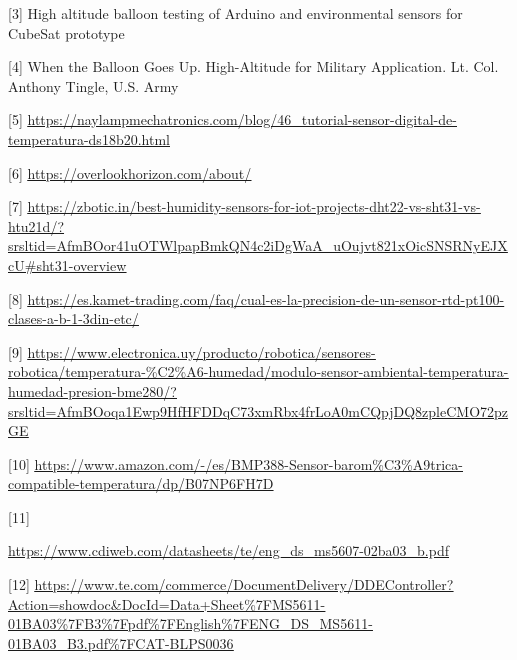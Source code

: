 \documentclass[12pt,a4paper]{article}
\begin{document}
{[}3{]} High altitude balloon testing of Arduino and environmental sensors for CubeSat prototype

{[}4{]} When the Balloon Goes Up. High-Altitude for Military Application. Lt. Col. Anthony Tingle, U.S. Army

{[}5{]} \href{https://naylampmechatronics.com/blog/46_tutorial-sensor-digital-de-temperatura-ds18b20.html}{\ul{https://naylampmechatronics.com/blog/46\_tutorial-sensor-digital-de-temperatura-ds18b20.html}}

{[}6{]} \href{https://overlookhorizon.com/about/}{\ul{https://overlookhorizon.com/about/}}

{[}7{]} \href{https://zbotic.in/best-humidity-sensors-for-iot-projects-dht22-vs-sht31-vs-htu21d/?srsltid=AfmBOor41uOTWlpapBmkQN4c2iDgWaA_uOujvt821xOicSNSRNyEJXcU\#sht31-overview}{\ul{https://zbotic.in/best-humidity-sensors-for-iot-projects-dht22-vs-sht31-vs-htu21d/?srsltid=AfmBOor41uOTWlpapBmkQN4c2iDgWaA\_uOujvt821xOicSNSRNyEJXcU\#sht31-overview}}

{[}8{]} \href{https://es.kamet-trading.com/faq/cual-es-la-precision-de-un-sensor-rtd-pt100-clases-a-b-1-3din-etc/}{\ul{https://es.kamet-trading.com/faq/cual-es-la-precision-de-un-sensor-rtd-pt100-clases-a-b-1-3din-etc/}}

{[}9{]} \href{https://www.electronica.uy/producto/robotica/sensores-robotica/temperatura-\%C2\%A6-humedad/modulo-sensor-ambiental-temperatura-humedad-presion-bme280/?srsltid=AfmBOoqa1Ewp9HfHFDDqC73xmRbx4frLoA0mCQpjDQ8zpleCMO72pzGE}{\ul{https://www.electronica.uy/producto/robotica/sensores-robotica/temperatura-\%C2\%A6-humedad/modulo-sensor-ambiental-temperatura-humedad-presion-bme280/?srsltid=AfmBOoqa1Ewp9HfHFDDqC73xmRbx4frLoA0mCQpjDQ8zpleCMO72pzGE}}

{[}10{]} \href{https://www.amazon.com/-/es/BMP388-Sensor-barom\%C3\%A9trica-compatible-temperatura/dp/B07NP6FH7D}{\ul{https://www.amazon.com/-/es/BMP388-Sensor-barom\%C3\%A9trica-compatible-temperatura/dp/B07NP6FH7D}}

{[}11{]}

\href{https://www.cdiweb.com/datasheets/te/eng_ds_ms5607-02ba03_b.pdf}{\ul{https://www.cdiweb.com/datasheets/te/eng\_ds\_ms5607-02ba03\_b.pdf}}

{[}12{]} \href{https://www.te.com/commerce/DocumentDelivery/DDEController?Action=showdoc&DocId=Data+Sheet\%7FMS5611-01BA03\%7FB3\%7Fpdf\%7FEnglish\%7FENG_DS_MS5611-01BA03_B3.pdf\%7FCAT-BLPS0036}{\ul{https://www.te.com/commerce/DocumentDelivery/DDEController?Action=showdoc\&DocId=Data+Sheet\%7FMS5611-01BA03\%7FB3\%7Fpdf\%7FEnglish\%7FENG\_DS\_MS5611-01BA03\_B3.pdf\%7FCAT-BLPS0036}}
\end{document}
